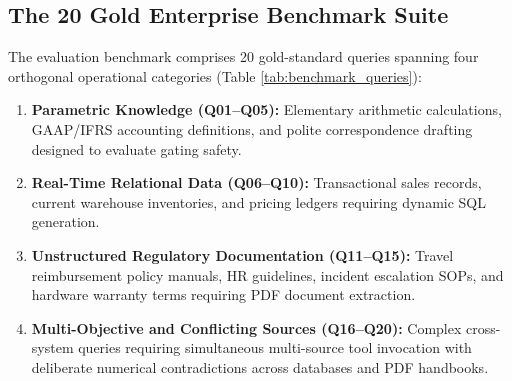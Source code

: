 \documentclass[conference,onecolumn,10pt]{IEEEtran}
\begin{document}
\subsection{The 20 Gold Enterprise Benchmark Suite}
The evaluation benchmark comprises 20 gold-standard queries spanning four orthogonal operational categories (Table \ref{tab:benchmark_queries}):
\begin{enumerate}
    \item \textbf{Parametric Knowledge (Q01--Q05):} Elementary arithmetic calculations, GAAP/IFRS accounting definitions, and polite correspondence drafting designed to evaluate gating safety.
    \item \textbf{Real-Time Relational Data (Q06--Q10):} Transactional sales records, current warehouse inventories, and pricing ledgers requiring dynamic SQL generation.
    \item \textbf{Unstructured Regulatory Documentation (Q11--Q15):} Travel reimbursement policy manuals, HR guidelines, incident escalation SOPs, and hardware warranty terms requiring PDF document extraction.
    \item \textbf{Multi-Objective and Conflicting Sources (Q16--Q20):} Complex cross-system queries requiring simultaneous multi-source tool invocation with deliberate numerical contradictions across databases and PDF handbooks.
\end{enumerate}
\end{document}
